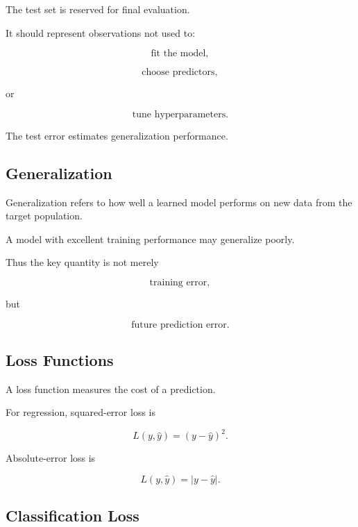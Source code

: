 The test set is reserved for final evaluation.

It should represent observations not used to:

\[
\boxed{
\text{fit the model},
}
\]

\[
\boxed{
\text{choose predictors},
}
\]

or

\[
\boxed{
\text{tune hyperparameters}.
}
\]

The test error estimates generalization performance.

\subsection{Generalization}
\label{subsec:generalization}

Generalization refers to how well a learned model performs on new data
from the target population.

A model with excellent training performance may generalize poorly.

Thus the key quantity is not merely

\[
\boxed{
\text{training error},
}
\]

but

\[
\boxed{
\text{future prediction error}.
}
\]

\subsection{Loss Functions}
\label{subsec:learning-loss-functions}

A loss function measures the cost of a prediction.

For regression, squared-error loss is

\[
\boxed{
L
(
y,\widehat{y}
)
=
(
y-\widehat{y}
)^2.
}
\]

Absolute-error loss is

\[
\boxed{
L
(
y,\widehat{y}
)
=
|
y-\widehat{y}
|.
}
\]

\subsection{Classification Loss}
\label{subsec:classification-loss}

